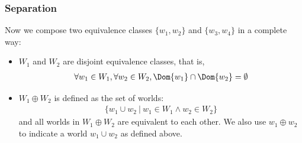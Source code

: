 \begin{frame}[fragile]
    \frametitle{Separation}


Now we compose two equivalence classes $\{w_1, w_2\}$ and $\{w_3, w_4\}$ in a complete way:
\begin{itemize}
    \item $W_1$ and $W_2$ are disjoint equivalence classes, that is,
    \begin{align*}
        \forall w_1 \in W_1, \forall w_2 \in W_2, \Dom{w_1} \cap \Dom{w_2} = \emptyset
    \end{align*}
    \item $W_1 \oplus W_2$ is defined as the set of worlds:
    \begin{align*}
        \{ w_1 \cup w_2 ~|~ w_1 \in W_1 \land w_2 \in W_2 \}
    \end{align*}
    and all worlds in $W_1\oplus W_2$ are equivalent to each other. We also use $w_1 \oplus w_2$ to indicate a world $w_1 \cup w_2$ as defined above.
\end{itemize}

\end{frame}


